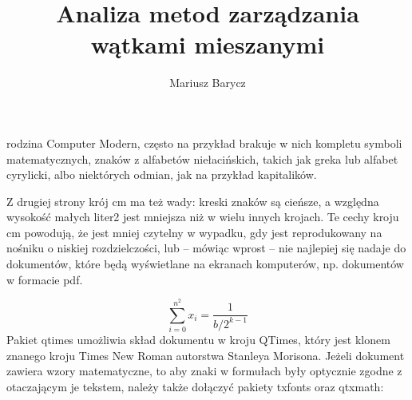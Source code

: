 \documentclass[a4paper]{article}
\author{Mariusz Barycz}
\title{Analiza metod zarządzania wątkami mieszanymi}
\begin{document}
 

\maketitle
\thispagestyle{empty}
\newpage
rodzina Computer Modern, często na przykład brakuje w nich kompletu
symboli matematycznych, znaków z alfabetów niełacińskich, takich jak greka
lub alfabet cyrylicki, albo niektórych odmian, jak na przykład kapitalików.

    Z drugiej strony krój cm ma też wady: kreski znaków są cieńsze, a
względna wysokość małych liter2 jest mniejsza niż w wielu innych krojach.
Te cechy kroju cm powodują, że jest mniej czytelny w wypadku, gdy jest
reprodukowany na nośniku o niskiej rozdzielczości, lub – mówiąc wprost –
nie najlepiej się nadaje do dokumentów, które będą wyświetlane na ekranach
komputerów, np. dokumentów w formacie pdf.

\begin{equation}
\sum_{i=0}^{n^2}{x_i} = \frac{1}{b / 2^{k-1}}
\end{equation}
    Pakiet qtimes umożliwia skład dokumentu w kroju QTimes, który jest
klonem znanego kroju Times New Roman autorstwa Stanleya Morisona.
Jeżeli dokument zawiera wzory matematyczne, to aby znaki w formułach
były optycznie zgodne z otaczającym je tekstem, należy także dołączyć
pakiety txfonts oraz qtxmath:
\end{document}
